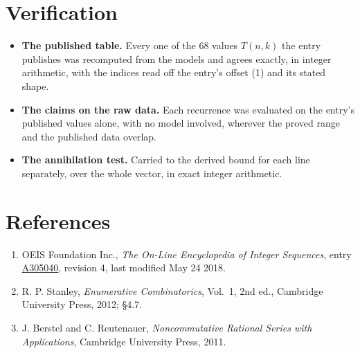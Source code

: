 \documentclass[11pt]{article}
\theoremstyle{definition}
\begin{document}
\section{Verification}

\begin{itemize}

\item {\bfseries The published table.} Every one of the 68 values $T(n,k)$ the entry publishes was recomputed from the models and agrees exactly, in integer arithmetic, with the indices read off the entry's offset (1) and its stated shape.

\item {\bfseries The claims on the raw data.} Each recurrence was evaluated on the entry's published values alone, with no model involved, wherever the proved range and the published data overlap.

\item {\bfseries The annihilation test.} Carried to the derived bound for each line separately, over the whole vector, in exact integer arithmetic.

\end{itemize}

\section{References}

\begin{enumerate}

\item OEIS Foundation Inc., \emph{The On-Line Encyclopedia of Integer Sequences}, entry \href{https://oeis.org/A305040}{A305040}, revision 4, last modified May 24 2018.

\item R. P. Stanley, \emph{Enumerative Combinatorics}, Vol.~1, 2nd ed., Cambridge University Press, 2012; \S4.7.

\item J. Berstel and C. Reutenauer, \emph{Noncommutative Rational Series with Applications}, Cambridge University Press, 2011.

\end{enumerate}
\end{document}
